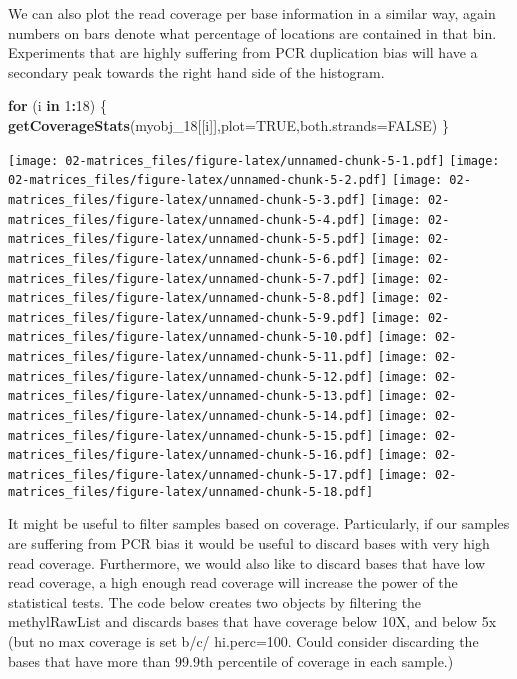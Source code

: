 \documentclass[]{article}
\newenvironment{Shaded}{\begin{snugshade}}{\end{snugshade}}
\newcommand{\KeywordTok}[1]{\textcolor[rgb]{0.13,0.29,0.53}{\textbf{#1}}}
\newcommand{\DataTypeTok}[1]{\textcolor[rgb]{0.13,0.29,0.53}{#1}}
\newcommand{\DecValTok}[1]{\textcolor[rgb]{0.00,0.00,0.81}{#1}}
\newcommand{\OtherTok}[1]{\textcolor[rgb]{0.56,0.35,0.01}{#1}}
\newcommand{\ControlFlowTok}[1]{\textcolor[rgb]{0.13,0.29,0.53}{\textbf{#1}}}
\newcommand{\OperatorTok}[1]{\textcolor[rgb]{0.81,0.36,0.00}{\textbf{#1}}}
\newcommand{\NormalTok}[1]{#1}
\begin{document}
We can also plot the read coverage per base information in a similar
way, again numbers on bars denote what percentage of locations are
contained in that bin. Experiments that are highly suffering from PCR
duplication bias will have a secondary peak towards the right hand side
of the histogram.

\begin{Shaded}
\begin{Highlighting}[]
\ControlFlowTok{for}\NormalTok{ (i }\ControlFlowTok{in} \DecValTok{1}\OperatorTok{:}\DecValTok{18}\NormalTok{) \{}
  \KeywordTok{getCoverageStats}\NormalTok{(myobj_}\DecValTok{18}\NormalTok{[[i]],}\DataTypeTok{plot=}\OtherTok{TRUE}\NormalTok{,}\DataTypeTok{both.strands=}\OtherTok{FALSE}\NormalTok{)}
\NormalTok{\}}
\end{Highlighting}
\end{Shaded}

\texttt{[image: 02-matrices\_files/figure-latex/unnamed-chunk-5-1.pdf]}
\texttt{[image: 02-matrices\_files/figure-latex/unnamed-chunk-5-2.pdf]}
\texttt{[image: 02-matrices\_files/figure-latex/unnamed-chunk-5-3.pdf]}
\texttt{[image: 02-matrices\_files/figure-latex/unnamed-chunk-5-4.pdf]}
\texttt{[image: 02-matrices\_files/figure-latex/unnamed-chunk-5-5.pdf]}
\texttt{[image: 02-matrices\_files/figure-latex/unnamed-chunk-5-6.pdf]}
\texttt{[image: 02-matrices\_files/figure-latex/unnamed-chunk-5-7.pdf]}
\texttt{[image: 02-matrices\_files/figure-latex/unnamed-chunk-5-8.pdf]}
\texttt{[image: 02-matrices\_files/figure-latex/unnamed-chunk-5-9.pdf]}
\texttt{[image: 02-matrices\_files/figure-latex/unnamed-chunk-5-10.pdf]}
\texttt{[image: 02-matrices\_files/figure-latex/unnamed-chunk-5-11.pdf]}
\texttt{[image: 02-matrices\_files/figure-latex/unnamed-chunk-5-12.pdf]}
\texttt{[image: 02-matrices\_files/figure-latex/unnamed-chunk-5-13.pdf]}
\texttt{[image: 02-matrices\_files/figure-latex/unnamed-chunk-5-14.pdf]}
\texttt{[image: 02-matrices\_files/figure-latex/unnamed-chunk-5-15.pdf]}
\texttt{[image: 02-matrices\_files/figure-latex/unnamed-chunk-5-16.pdf]}
\texttt{[image: 02-matrices\_files/figure-latex/unnamed-chunk-5-17.pdf]}
\texttt{[image: 02-matrices\_files/figure-latex/unnamed-chunk-5-18.pdf]}

It might be useful to filter samples based on coverage. Particularly, if
our samples are suffering from PCR bias it would be useful to discard
bases with very high read coverage. Furthermore, we would also like to
discard bases that have low read coverage, a high enough read coverage
will increase the power of the statistical tests. The code below creates
two objects by filtering the methylRawList and discards bases that have
coverage below 10X, and below 5x (but no max coverage is set b/c/
hi.perc=100. Could consider discarding the bases that have more than
99.9th percentile of coverage in each sample.)
\end{document}
